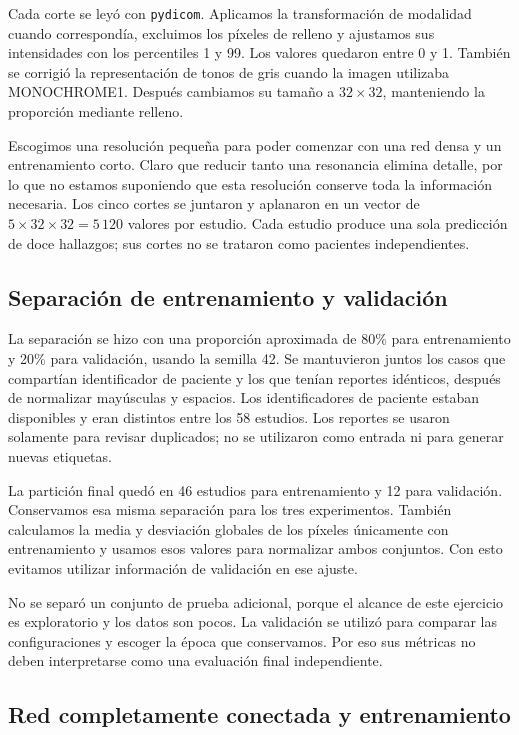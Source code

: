 \documentclass[eng]{ajceam-class}
\begin{document}
Cada corte se leyó con \texttt{pydicom}. Aplicamos la transformación de modalidad cuando correspondía, excluimos los píxeles de relleno y ajustamos sus intensidades con los percentiles 1 y 99. Los valores quedaron entre 0 y 1. También se corrigió la representación de tonos de gris cuando la imagen utilizaba MONOCHROME1. Después cambiamos su tamaño a $32\times32$, manteniendo la proporción mediante relleno.

Escogimos una resolución pequeña para poder comenzar con una red densa y un entrenamiento corto. Claro que reducir tanto una resonancia elimina detalle, por lo que no estamos suponiendo que esta resolución conserve toda la información necesaria. Los cinco cortes se juntaron y aplanaron en un vector de $5\times32\times32=5\,120$ valores por estudio. Cada estudio produce una sola predicción de doce hallazgos; sus cortes no se trataron como pacientes independientes.

\subsection{Separación de entrenamiento y validación}

La separación se hizo con una proporción aproximada de 80\% para entrenamiento y 20\% para validación, usando la semilla 42. Se mantuvieron juntos los casos que compartían identificador de paciente y los que tenían reportes idénticos, después de normalizar mayúsculas y espacios. Los identificadores de paciente estaban disponibles y eran distintos entre los 58 estudios. Los reportes se usaron solamente para revisar duplicados; no se utilizaron como entrada ni para generar nuevas etiquetas.

La partición final quedó en 46 estudios para entrenamiento y 12 para validación. Conservamos esa misma separación para los tres experimentos. También calculamos la media y desviación globales de los píxeles únicamente con entrenamiento y usamos esos valores para normalizar ambos conjuntos. Con esto evitamos utilizar información de validación en ese ajuste.

No se separó un conjunto de prueba adicional, porque el alcance de este ejercicio es exploratorio y los datos son pocos. La validación se utilizó para comparar las configuraciones y escoger la época que conservamos. Por eso sus métricas no deben interpretarse como una evaluación final independiente.

\subsection{Red completamente conectada y entrenamiento}
\end{document}
